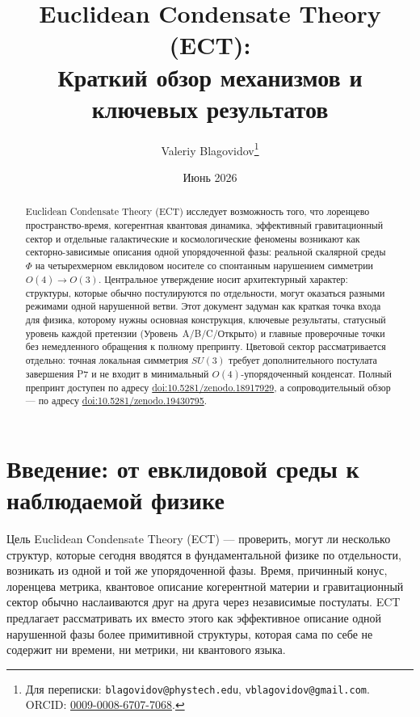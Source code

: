 \documentclass[11pt,a4paper]{article}
\title{\textbf{Euclidean Condensate Theory (ECT):\\
Краткий обзор механизмов и ключевых результатов}}
\author{Valeriy Blagovidov\thanks{Для переписки:
\texttt{blagovidov@phystech.edu},
\texttt{vblagovidov@gmail.com}.\,
ORCID: \href{https://orcid.org/0009-0008-6707-7068}{0009-0008-6707-7068}.}}
\date{Июнь 2026}
\begin{document}
\maketitle

\begin{abstract}
\noindent
Euclidean Condensate Theory (ECT) исследует возможность того,
что лоренцево пространство-время, когерентная квантовая
динамика, эффективный гравитационный сектор и отдельные
галактические и космологические феномены возникают как
секторно-зависимые описания одной упорядоченной фазы: реальной
скалярной среды $\Phi$ на четырехмерном евклидовом носителе со
спонтанным нарушением симметрии $O(4)\!\to\!O(3)$.
Центральное утверждение носит архитектурный характер: структуры,
которые обычно постулируются по отдельности, могут оказаться
разными режимами одной нарушенной ветви.
Этот документ задуман как краткая точка входа для физика,
которому нужны основная конструкция, ключевые результаты,
статусный уровень каждой претензии (Уровень~A/B/C/Открыто) и
главные проверочные точки без немедленного обращения к полному
препринту.
Цветовой сектор рассматривается отдельно: точная локальная
симметрия $SU(3)$ требует дополнительного постулата завершения
P7 и не входит в минимальный $O(4)$-упорядоченный конденсат.
Полный препринт доступен по адресу
\href{https://doi.org/10.5281/zenodo.18917929}{doi:10.5281/zenodo.18917929},
а сопроводительный обзор — по адресу
\href{https://doi.org/10.5281/zenodo.19430795}{doi:10.5281/zenodo.19430795}.
\end{abstract}

\section{Введение: от евклидовой среды к наблюдаемой физике}
\label{sec:intro}

Цель Euclidean Condensate Theory (ECT) — проверить, могут ли
несколько структур, которые сегодня вводятся в фундаментальной
физике по отдельности, возникать из одной и той же
упорядоченной фазы. Время, причинный конус, лоренцева метрика,
квантовое описание когерентной материи и гравитационный сектор
обычно наслаиваются друг на друга через независимые постулаты.
ECT предлагает рассматривать их вместо этого как эффективное
описание одной нарушенной фазы более примитивной структуры,
которая сама по себе не содержит ни времени, ни метрики, ни
квантового языка.
\end{document}
